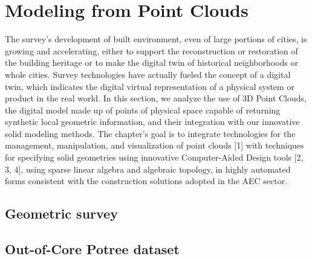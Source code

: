 \chapter{Modeling from Point Clouds}\label{chapt:11}

The survey’s development of built environment, even of large portions of cities, is growing and accelerating, either to support the reconstruction or restoration of the building heritage or to make the digital twin of historical neighborhoods or whole cities.
Survey technologies have actually fueled the concept of a digital twin, which indicates the digital virtual representation of a physical system or product in the real world.
In this section, we analyze the use of 3D Point Clouds, the digital model made up of points of physical space capable of returning synthetic local geometric information, and their integration with our innovative solid modeling methods.
The chapter's goal is to integrate technologies for the management, manipulation, and visualization of point clouds [1] with techniques for specifying solid geometries using innovative Computer-Aided Design tools [2, 3, 4], using sparse linear algebra and algebraic topology, in highly automated forms consistent with the construction solutions adopted in the AEC sector.



\section{ Geometric survey}\label{sect:11-1}



\section{ Out-of-Core Potree dataset}\label{sect:11-2}




